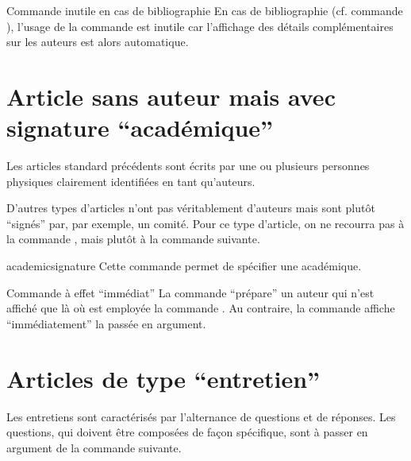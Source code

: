 \begin{dbwarning}{Commande \protect{} inutile
    en cas de bibliographie}{}
  En cas de bibliographie (cf. commande ), l'usage de
  la commande  est inutile car l'affichage des
  détails complémentaires sur les auteurs est alors automatique.
\end{dbwarning}

\section{Article sans auteur mais avec signature \enquote{académique}}
\label{sec-article-sans-auteur}

Les articles standard précédents sont écrits par une ou plusieurs personnes
physiques clairement identifiées en tant qu'auteurs.

D'autres types d'articles n'ont pas véritablement d'auteurs mais sont plutôt
\enquote{signés} par, par exemple, un comité. Pour ce type d'article, on ne
recourra pas à la commande , mais plutôt à la commande
 suivante.

\begin{docCommand}{academicsignature}{}
  Cette commande permet de spécifier une  académique.
\begin{bodycode}
\end{bodycode}
\end{docCommand}

\begin{dbwarning}{Commande \protect{} à effet \enquote{immédiat}}{}
  La commande  \enquote{prépare} un auteur qui n'est affiché que
  là où est employée la commande . Au contraire, la commande
   affiche \enquote{immédiatement} la 
  passée en argument.
\end{dbwarning}

\section{Articles de type \enquote{entretien}}
\label{sec-entretiens}

Les entretiens sont caractérisés par l'alternance de questions et de
réponses. Les questions, qui doivent être composées de façon spécifique, sont
à passer en argument de la commande  suivante.

